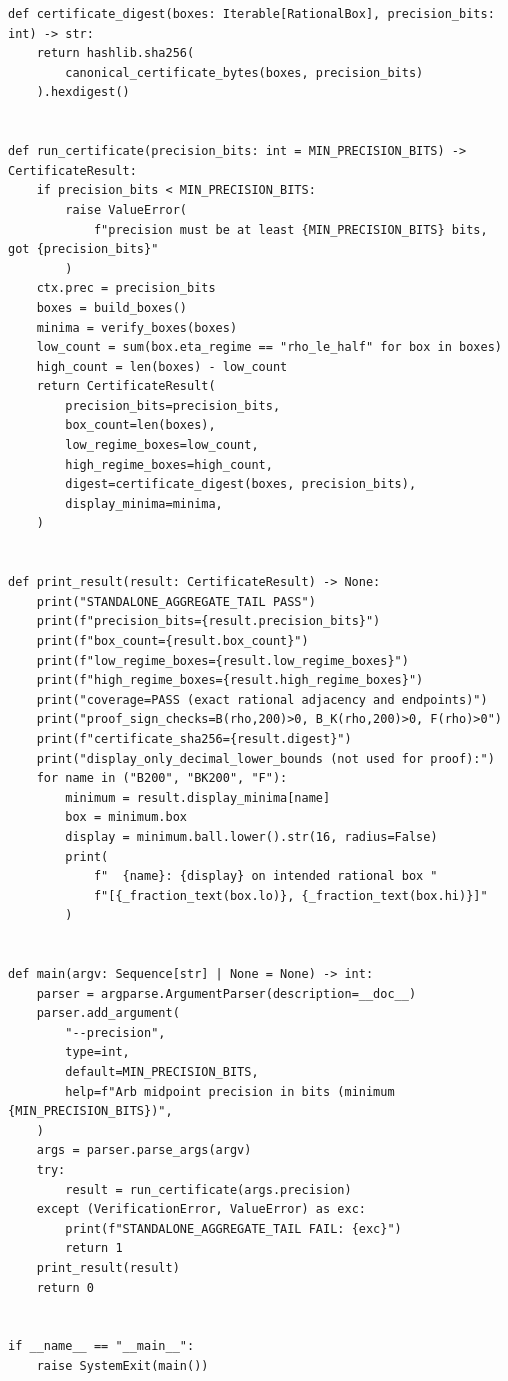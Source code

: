 \documentclass[11pt]{article}
\numberwithin{equation}{section}
\theoremstyle{definition}
\theoremstyle{remark}
\begin{document}
\begin{lstlisting}
def certificate_digest(boxes: Iterable[RationalBox], precision_bits: int) -> str:
    return hashlib.sha256(
        canonical_certificate_bytes(boxes, precision_bits)
    ).hexdigest()


def run_certificate(precision_bits: int = MIN_PRECISION_BITS) -> CertificateResult:
    if precision_bits < MIN_PRECISION_BITS:
        raise ValueError(
            f"precision must be at least {MIN_PRECISION_BITS} bits, got {precision_bits}"
        )
    ctx.prec = precision_bits
    boxes = build_boxes()
    minima = verify_boxes(boxes)
    low_count = sum(box.eta_regime == "rho_le_half" for box in boxes)
    high_count = len(boxes) - low_count
    return CertificateResult(
        precision_bits=precision_bits,
        box_count=len(boxes),
        low_regime_boxes=low_count,
        high_regime_boxes=high_count,
        digest=certificate_digest(boxes, precision_bits),
        display_minima=minima,
    )


def print_result(result: CertificateResult) -> None:
    print("STANDALONE_AGGREGATE_TAIL PASS")
    print(f"precision_bits={result.precision_bits}")
    print(f"box_count={result.box_count}")
    print(f"low_regime_boxes={result.low_regime_boxes}")
    print(f"high_regime_boxes={result.high_regime_boxes}")
    print("coverage=PASS (exact rational adjacency and endpoints)")
    print("proof_sign_checks=B(rho,200)>0, B_K(rho,200)>0, F(rho)>0")
    print(f"certificate_sha256={result.digest}")
    print("display_only_decimal_lower_bounds (not used for proof):")
    for name in ("B200", "BK200", "F"):
        minimum = result.display_minima[name]
        box = minimum.box
        display = minimum.ball.lower().str(16, radius=False)
        print(
            f"  {name}: {display} on intended rational box "
            f"[{_fraction_text(box.lo)}, {_fraction_text(box.hi)}]"
        )


def main(argv: Sequence[str] | None = None) -> int:
    parser = argparse.ArgumentParser(description=__doc__)
    parser.add_argument(
        "--precision",
        type=int,
        default=MIN_PRECISION_BITS,
        help=f"Arb midpoint precision in bits (minimum {MIN_PRECISION_BITS})",
    )
    args = parser.parse_args(argv)
    try:
        result = run_certificate(args.precision)
    except (VerificationError, ValueError) as exc:
        print(f"STANDALONE_AGGREGATE_TAIL FAIL: {exc}")
        return 1
    print_result(result)
    return 0


if __name__ == "__main__":
    raise SystemExit(main())
\end{lstlisting}
\end{document}
